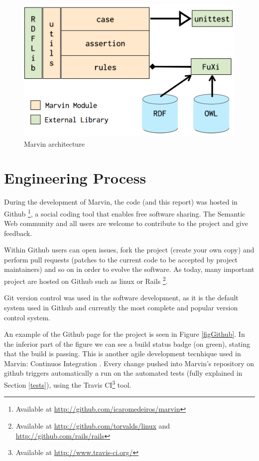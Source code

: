 \documentclass{report}
\begin{document}
\begin{figure}[!hbt]
    \centering
    \label{figArchitecture}
    \caption{Marvin architecture}
    \includegraphics[scale=0.33]{fig/architecture.png}
\end{figure}

\section{Engineering Process}

During the development of Marvin, the code (and this report) was hosted in Github
\footnote{Available at \url{http://github.com/icaromedeiros/marvin}}, a social coding tool that enables free software
sharing. The Semantic Web community and all users are welcome to contribute to the project and give feedback.

Within Github users can open issues, fork the project (create your own copy) and perform pull requests (patches to the
current code to be accepted by project maintainers) and so on in order to evolve the software. As today, many
important project are hosted on Github such as linux or Rails \footnote{Available at \url{http://github.com/torvalds/linux}
and \url{http://github.com/rails/rails}}.

Git version control was used in the software development, as it is the
default system used in Github and currently the most complete and popular version control system.

An example of the Github page for the project is seen in Figure \ref{figGithub}. In the inferior part of the figure we can see a build status badge (on green), stating that the build is passing. This is another agile development tecnhique used in Marvin: Continuos Integration \cite{beck04}. Every change pushed into Marvin's repository on github triggers automatically a run on the automated tests (fully explained in Section \ref{tests}), using the Travis CI\footnote{Available at \url{http://www.travis-ci.org/}} tool.
\end{document}
